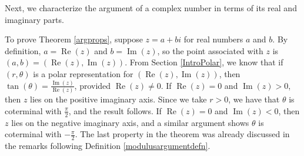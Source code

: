\smallskip

Next, we characterize the argument of a complex number in terms of its real and imaginary parts.

\smallskip


\smallskip

To prove Theorem \ref{argprops}, suppose $z = a + bi$ for real numbers $a$ and $b$.  By definition, $a = \operatorname{Re}(z)$ and $b = \operatorname{Im}(z)$, so the point associated with $z$ is $(a,b) = \left(\operatorname{Re}(z), \operatorname{Im}(z)\right)$.  From Section \ref{IntroPolar}, we know that if $(r,\theta)$ is a polar representation for $\left(\operatorname{Re}(z), \operatorname{Im}(z)\right)$, then $\tan(\theta) = \frac{\operatorname{Im}(z)}{\operatorname{Re}(z)}$, provided $\operatorname{Re}(z) \neq 0$.  If $\operatorname{Re}(z) = 0$ and $\operatorname{Im}(z) > 0$, then $z$ lies on the positive imaginary axis.  Since we take $r > 0$,  we have that $\theta$ is coterminal with $\frac{\pi}{2}$, and the result follows.   If $\operatorname{Re}(z) = 0$ and $\operatorname{Im}(z) < 0$, then $z$ lies on the negative imaginary axis, and a similar argument shows $\theta$ is coterminal with $-\frac{\pi}{2}$.  The last property in the theorem was already discussed in the remarks following Definition \ref{modulusargumentdefn}.  


